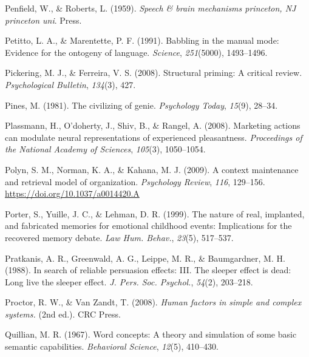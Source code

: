 \documentclass[
]{krantz}
\newlength{\cslhangindent}
\newlength{\cslentryspacingunit} %
\newenvironment{CSLReferences}[2] %
 {%
  \setlength{\parindent}{0pt}
  \ifodd #1
  \let\oldpar\par
  \def\par{\hangindent=\cslhangindent\oldpar}
  \fi
  \setlength{\parskip}{#2\cslentryspacingunit}
 }%
 {}
\begin{document}
\begin{CSLReferences}{1}{0}
\leavevmode{}%
Penfield, W., \& Roberts, L. (1959). \emph{Speech \& brain mechanisms princeton, NJ princeton uni}. Press.

\leavevmode{}%
Petitto, L. A., \& Marentette, P. F. (1991). Babbling in the manual mode: Evidence for the ontogeny of language. \emph{Science}, \emph{251}(5000), 1493--1496.

\leavevmode{}%
Pickering, M. J., \& Ferreira, V. S. (2008). Structural priming: A critical review. \emph{Psychological Bulletin}, \emph{134}(3), 427.

\leavevmode{}%
Pines, M. (1981). The civilizing of genie. \emph{Psychology Today}, \emph{15}(9), 28--34.

\leavevmode{}%
Plassmann, H., O'doherty, J., Shiv, B., \& Rangel, A. (2008). Marketing actions can modulate neural representations of experienced pleasantness. \emph{Proceedings of the National Academy of Sciences}, \emph{105}(3), 1050--1054.

\leavevmode{}%
Polyn, S. M., Norman, K. A., \& Kahana, M. J. (2009). A context maintenance and retrieval model of organization. \emph{Psychology Review}, \emph{116}, 129--156. \url{https://doi.org/10.1037/a0014420.A}

\leavevmode{}%
Porter, S., Yuille, J. C., \& Lehman, D. R. (1999). The nature of real, implanted, and fabricated memories for emotional childhood events: Implications for the recovered memory debate. \emph{Law Hum. Behav.}, \emph{23}(5), 517--537.

\leavevmode{}%
Pratkanis, A. R., Greenwald, A. G., Leippe, M. R., \& Baumgardner, M. H. (1988). In search of reliable persuasion effects: {III}. The sleeper effect is dead: Long live the sleeper effect. \emph{J. Pers. Soc. Psychol.}, \emph{54}(2), 203--218.

\leavevmode{}%
Proctor, R. W., \& Van Zandt, T. (2008). \emph{Human factors in simple and complex systems.} (2nd ed.). CRC Press.

\leavevmode{}%
Quillian, M. R. (1967). Word concepts: A theory and simulation of some basic semantic capabilities. \emph{Behavioral Science}, \emph{12}(5), 410--430.


\end{CSLReferences}
\end{document}
